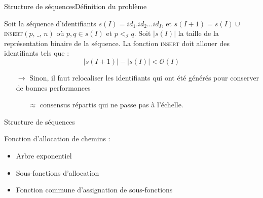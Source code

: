 \begin{frame}{Structure de séquences}{Définition du problème}

  \begin{problem}
    Soit la séquence d'identifiants $s(I)= id_1.id_2\ldots id_I$, et
    $s(I+1) = s(I) \cup $\textsc{insert}$(p,\, \_,\, n)$ où $p,q \in s(I)$ et
    $p<_\mathcal{I}q$. Soit $|s(I)|$ la taille de la représentation binaire de la
    séquence. La fonction \textsc{insert} doit allouer des identifiants tels que :
    \begin{equation}
      |s(I+1)| - |s(I)| < \mathcal{O}(I)
    \end{equation}
  \end{problem}
  
  \vspace{0.5cm}

  \begin{itemize}
  \item [$\rightarrow$] Sinon, il faut relocaliser les identifiants qui ont été
    générés pour conserver de bonnes performances
    \begin{itemize}
    \item [$\approx$] consensus répartis qui ne passe pas à l'échelle.
    \end{itemize}
  \end{itemize}

\end{frame}


\begin{frame}{Structure de séquences}{\LSEQ}
  
  Fonction d'allocation de chemins :
  \begin{itemize}
  \item Arbre exponentiel
  \item Sous-fonctions d'allocation
  \item Fonction commune d'assignation de sous-fonctions    
  \end{itemize}
  
\end{frame}
